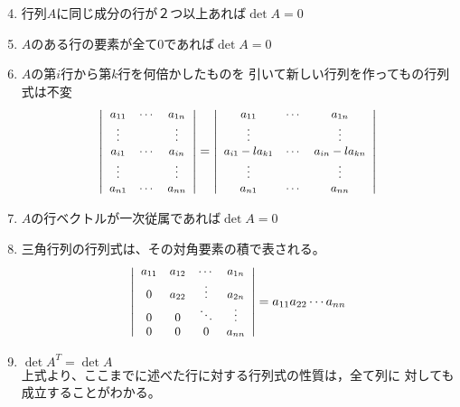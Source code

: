 \documentclass[twocolumn,11pt]{jarticle}
\begin{document}
\begin{enumerate}
  \setcounter{enumi}{3}
\item 行列$A$に同じ成分の行が２つ以上あれば$\det A=0$
\item $A$のある行の要素が全て0であれば$\det A=0$
\item\label{item:|eliminate|} $A$の第$i$行から第$k$行を何倍かしたものを
  引いて新しい行列を作ってもの行列式は不変
  \begin{align}\small
      \left|
        \begin{array}{ccc}
          a_{11}&\cdots&a_{1n}\\
          \vdots&&\vdots\\
          a_{i1}&\cdots&a_{in}\\
          \vdots&&\vdots\\
          a_{n1}&\cdots&a_{nn}
        \end{array}\right|
      =
      \left|
        \begin{array}{ccc}
          a_{11}&\cdots&a_{1n}\\
          \vdots&&\vdots\\
          a_{i1}-la_{k1}&\cdots&a_{in}-la_{kn}\\
          \vdots&&\vdots\\
          a_{n1}&\cdots&a_{nn}
        \end{array}\right|\notag
    \end{align}
\item $A$の行ベクトルが一次従属であれば$\det A=0$
\item\label{item:|triangular|} 三角行列の行列式は、その対角要素の積で表される。
  \begin{align}\small
    \left|
      \begin{array}{cccc}
        a_{11}& a_{12} & \cdots &a_{1n}\\
        0 & a_{22}& \vdots &a_{2n}\\
        0 & 0 &\ddots& \vdots\\
        0 & 0 & 0 & a_{nn}
      \end{array}\right|
    =a_{11}a_{22}\cdots a_{nn}\notag
  \end{align}
\item $\det A^T=\det A$\\
  \comment 上式より、ここまでに述べた行に対する行列式の性質は，全て列に
  対しても成立することがわかる。
\end{enumerate}
\end{document}
